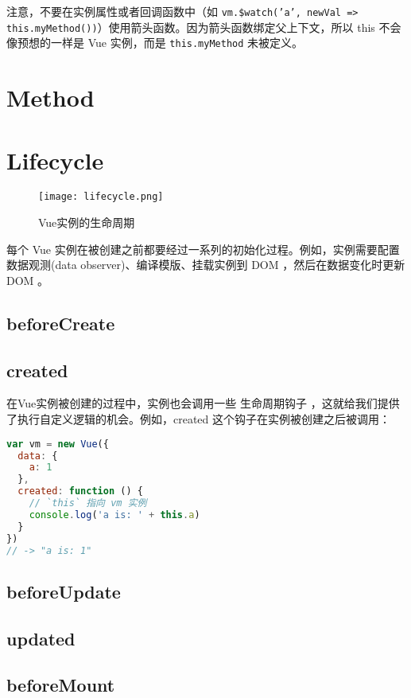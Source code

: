 注意，不要在实例属性或者回调函数中（如 \texttt{vm.\$watch('a', newVal => this.myMethod())}）使用箭头函数。因为箭头函数绑定父上下文，所以 this 不会像预想的一样是 Vue 实例，而是 \texttt{this.myMethod} 未被定义。

\section{Method}


\section{Lifecycle}

\begin{figure}[htbp]
\centering
\texttt{[image: lifecycle.png]}
\caption{Vue实例的生命周期}
\end{figure}

每个 Vue 实例在被创建之前都要经过一系列的初始化过程。例如，实例需要配置数据观测(data observer)、编译模版、挂载实例到 DOM ，然后在数据变化时更新 DOM 。


\subsection{beforeCreate}


\subsection{created}


在Vue实例被创建的过程中，实例也会调用一些 生命周期钩子 ，这就给我们提供了执行自定义逻辑的机会。例如，created 这个钩子在实例被创建之后被调用：

\begin{lstlisting}[language=JavaScript]
var vm = new Vue({
  data: {
    a: 1
  },
  created: function () {
    // `this` 指向 vm 实例
    console.log('a is: ' + this.a)
  }
})
// -> "a is: 1"
\end{lstlisting}


\subsection{beforeUpdate}


\subsection{updated}




\subsection{beforeMount}



